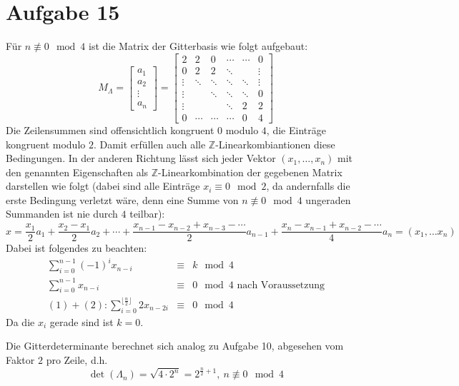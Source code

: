 \section*{Aufgabe 15}
Für $n \not\equiv 0\mod4$ ist die Matrix der Gitterbasis wie folgt aufgebaut:
\[
M_\Lambda = \begin{bmatrix} a_1 \\ a_2 \\ \vdots \\ a_n \end{bmatrix} = 
	\begin{bmatrix}
		2&2&0&\cdots&\cdots&0\\
		0&2&2&\ddots&&\vdots\\
		\vdots&\ddots&\ddots&\ddots&\ddots&\vdots\\
		\vdots&&\ddots&\ddots&\ddots&0\\
		\vdots&&&\ddots&2&2\\
		0&\cdots&\cdots&\cdots&0&4
	\end{bmatrix}
\]
Die Zeilensummen sind offensichtlich kongruent $0$ modulo $4$, die Einträge
kongruent modulo $2$. Damit erfüllen auch alle $\mathbb{Z}$-Linearkombiantionen
diese Bedingungen. In der anderen Richtung lässt sich jeder Vektor
$(x_1,\dots,x_n)$ mit den genannten Eigenschaften als
$\mathbb{Z}$-Linearkombination der gegebenen Matrix darstellen wie folgt (dabei
sind alle Einträge $x_i \equiv 0\mod2$, da andernfalls die erste Bedingung
verletzt wäre, denn eine Summe von $n \not\equiv 0\mod4$ ungeraden Summanden
ist nie durch $4$ teilbar):
\[ x = \frac{x_1}{2} a_1 + \frac{x_2-x_1}{2} a_2 + \cdots +
\frac{x_{n-1}-x_{n-2}+x_{n-3}-\cdots}{2} a_{n-1} +
\frac{x_n-x_{n-1}+x_{n-2}-\cdots}{4} a_n = (x_1, \dots x_n) \]
Dabei ist folgendes zu beachten:
\begin{eqnarray}
	\sum_{i=0}^{n-1} (-1)^i x_{n-i} &\equiv& k\mod 4 \\
	\sum_{i=0}^{n-1} x_{n-i} &\equiv& 0\mod 4 \text{ nach Voraussetzung} \\
	\nonumber (1) + (2): \sum_{i=0}^{\lfloor\frac{n}{2}\rfloor} 2 x_{n-2i} &\equiv& 0\mod 4
\end{eqnarray}
Da die $x_i$ gerade sind ist $k = 0$.

Die Gitterdeterminante berechnet sich analog zu Aufgabe 10, abgesehen vom
Faktor $2$ pro Zeile, d.h.
\[ \det(\Lambda_n) = \sqrt{4\cdot2^n} = 2^{\frac{n}{2} + 1},\ n \not\equiv 0\mod4 \]

